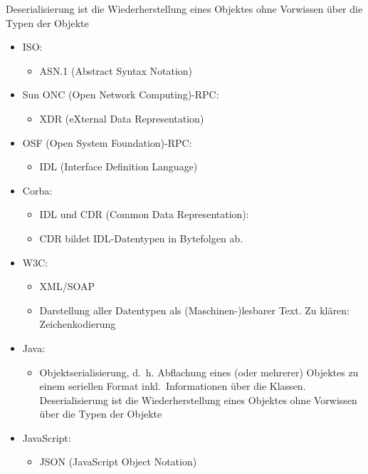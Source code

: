Deserialisierung ist die Wiederherstellung eines Objektes ohne Vorwissen über die Typen der Objekte

\begin{itemize}
    \item ISO:
    \begin{itemize}
        \item ASN.1 (Abstract Syntax Notation)
    \end{itemize}
    \item Sun ONC (Open Network Computing)-RPC:
    \begin{itemize}
        \item XDR (eXternal Data Representation)
    \end{itemize}
    \item OSF (Open System Foundation)-RPC:
    \begin{itemize}
        \item IDL (Interface Definition Language)
    \end{itemize}
    \item Corba:
    \begin{itemize}
        \item IDL und CDR (Common Data Representation):
        \item CDR bildet IDL-Datentypen in Bytefolgen ab.
    \end{itemize}
    \item W3C:
    \begin{itemize}
        \item XML/SOAP
        \item Darstellung aller Datentypen als (Maschinen-)lesbarer Text.
        Zu klären: Zeichenkodierung
    \end{itemize}
    \item Java:
    \begin{itemize}
        \item Objektserialisierung, d.\ h. Abflachung eines (oder mehrerer) Objektes zu einem seriellen Format inkl.\ Informationen über die Klassen.
        Deserialisierung ist die Wiederherstellung eines Objektes ohne Vorwissen über die Typen der Objekte
    \end{itemize}
    \item JavaScript:
    \begin{itemize}
        \item JSON (JavaScript Object Notation)
    \end{itemize}
\end{itemize}

